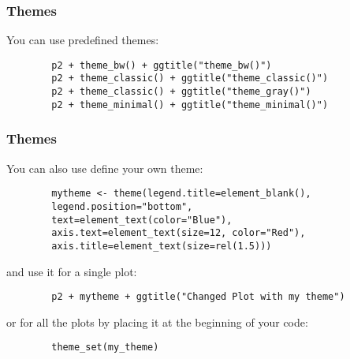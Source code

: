 \documentclass{beamer}
\begin{document}
	\begin{frame}[fragile]
		\frametitle{Themes}

		You can use predefined themes:

		\vspace{2em}

		\begin{exampleblock}{}
		\begin{BVerbatim}
		p2 + theme_bw() + ggtitle("theme_bw()")
		p2 + theme_classic() + ggtitle("theme_classic()")
		p2 + theme_classic() + ggtitle("theme_gray()")
		p2 + theme_minimal() + ggtitle("theme_minimal()")
		\end{BVerbatim}
		\end{exampleblock}{}

	\end{frame}

	\begin{frame}[fragile]
		\frametitle{Themes}

		You can also use define your own theme:

		\begin{exampleblock}{}
		\begin{BVerbatim}
		mytheme <- theme(legend.title=element_blank(),
		legend.position="bottom",
		text=element_text(color="Blue"),
		axis.text=element_text(size=12, color="Red"),
		axis.title=element_text(size=rel(1.5)))
		\end{BVerbatim}
		\end{exampleblock}{}

		and use it for a single plot:

		\begin{exampleblock}{}
		\begin{BVerbatim}
		p2 + mytheme + ggtitle("Changed Plot with my theme")
		\end{BVerbatim}
		\end{exampleblock}{}

		or for all the plots by placing it at the beginning of your code:

		\begin{exampleblock}{}
		\begin{BVerbatim}
		theme_set(my_theme)
		\end{BVerbatim}
		\end{exampleblock}{}

	\end{frame}
\end{document}
